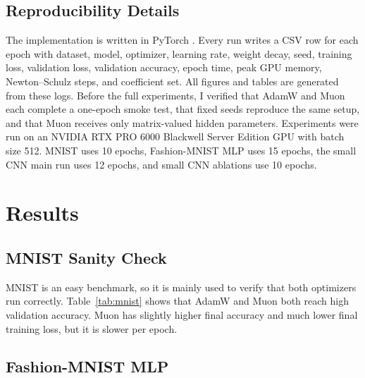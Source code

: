 \documentclass{article}
\begin{document}
\subsection{Reproducibility Details}

The implementation is written in PyTorch \citep{paszke2019pytorch}. Every run writes a CSV row for each epoch with dataset, model, optimizer, learning rate, weight decay, seed, training loss, validation loss, validation accuracy, epoch time, peak GPU memory, Newton--Schulz steps, and coefficient set. All figures and tables are generated from these logs. Before the full experiments, I verified that AdamW and Muon each complete a one-epoch smoke test, that fixed seeds reproduce the same setup, and that Muon receives only matrix-valued hidden parameters. Experiments were run on an NVIDIA RTX PRO 6000 Blackwell Server Edition GPU with batch size 512. MNIST uses 10 epochs, Fashion-MNIST MLP uses 15 epochs, the small CNN main run uses 12 epochs, and small CNN ablations use 10 epochs.

\section{Results}

\subsection{MNIST Sanity Check}

MNIST is an easy benchmark, so it is mainly used to verify that both optimizers run correctly. Table~\ref{tab:mnist} shows that AdamW and Muon both reach high validation accuracy. Muon has slightly higher final accuracy and much lower final training loss, but it is slower per epoch.

\begin{table}[t]
\centering
\caption{MNIST sanity check.}
\label{tab:mnist}
\small
\setlength{\tabcolsep}{3pt}
\end{table}

\subsection{Fashion-MNIST MLP}
\end{document}

